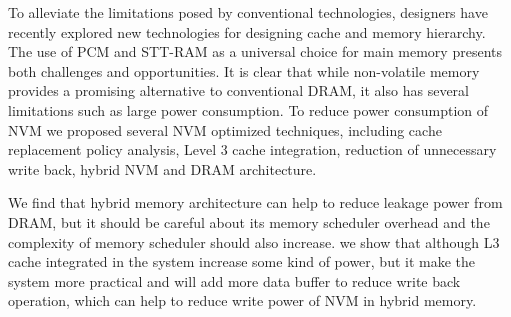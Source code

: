 
To alleviate the limitations posed by conventional technologies, designers have recently explored new technologies for designing cache and memory hierarchy. The use of PCM and STT-RAM as a universal choice for main memory presents both challenges and opportunities. It is clear that while non-volatile memory provides a promising alternative to conventional DRAM, it also has several limitations such as large power consumption. To reduce power consumption of NVM we proposed several NVM optimized techniques, including cache replacement policy analysis, Level 3 cache integration, reduction of unnecessary write back, hybrid NVM and DRAM architecture.   


We find that hybrid memory architecture can help to reduce leakage power from DRAM, but it should be careful about its memory scheduler overhead and the complexity of memory scheduler should also increase. we show that although L3 cache integrated in the system increase some kind of power, but it make the system more practical and will add more data buffer to reduce write back operation, which can help to reduce write power of NVM in hybrid memory.  



